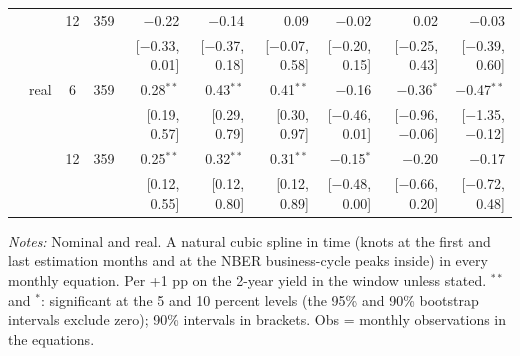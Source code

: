 \begin{longtable}{llcrrrrrrr}
 &  & 12 & 359 & $-$0.22 & $-$0.14 & 0.09 & $-$0.02 & 0.02 & $-$0.03\\
 & & & & {\scriptsize [$-$0.33, 0.01]} & {\scriptsize [$-$0.37, 0.18]} & {\scriptsize [$-$0.07, 0.58]} & {\scriptsize [$-$0.20, 0.15]} & {\scriptsize [$-$0.25, 0.43]} & {\scriptsize [$-$0.39, 0.60]}\\
 & real & 6 & 359 & 0.28$^{**}$ & 0.43$^{**}$ & 0.41$^{**}$ & $-$0.16 & $-$0.36$^{*}$ & $-$0.47$^{**}$\\
 & & & & {\scriptsize [0.19, 0.57]} & {\scriptsize [0.29, 0.79]} & {\scriptsize [0.30, 0.97]} & {\scriptsize [$-$0.46, 0.01]} & {\scriptsize [$-$0.96, $-$0.06]} & {\scriptsize [$-$1.35, $-$0.12]}\\
 &  & 12 & 359 & 0.25$^{**}$ & 0.32$^{**}$ & 0.31$^{**}$ & $-$0.15$^{*}$ & $-$0.20 & $-$0.17\\
 & & & & {\scriptsize [0.12, 0.55]} & {\scriptsize [0.12, 0.80]} & {\scriptsize [0.12, 0.89]} & {\scriptsize [$-$0.48, 0.00]} & {\scriptsize [$-$0.66, 0.20]} & {\scriptsize [$-$0.72, 0.48]}\\
\end{longtable}
\begin{flushleft}\footnotesize\textit{Notes:} Nominal and real. A natural cubic spline in time (knots at the first and last estimation months and at the NBER business-cycle peaks inside) in every monthly equation. Per +1 pp on the 2-year yield in the window unless stated. $^{**}$ and $^{*}$: significant at the 5 and 10 percent levels (the 95\% and 90\% bootstrap intervals exclude zero); 90\% intervals in brackets. Obs = monthly observations in the equations.\end{flushleft}
\endgroup
